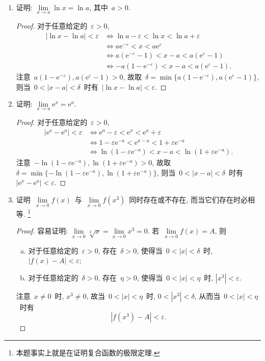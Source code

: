 \documentclass[UTF8,a4paper,11pt,twoside]{book}
\newcommand{\e}{\mathrm e}
\begin{document}
\begin{enumerate}
	\item 证明: $\lim\limits_{x\to a} \ln{x}=\ln{a}$, 其中~$a>0$.
	      \begin{proof}
		      对于任意给定的~$\varepsilon>0$,
		      \[
			      \begin{split}
				      |\ln{x}-\ln{a}|<\varepsilon &\Leftrightarrow  \ln{a}-\varepsilon<\ln{x}<\ln{a}+\varepsilon \\
				      &\Leftrightarrow  a\e^{-\varepsilon}<x<a\e^{\varepsilon}\\
				      &\Leftrightarrow  a(\e^{-\varepsilon}-1)<x-a<a(\e^{\varepsilon}-1)\\
				      &\Leftrightarrow -a(1-\e^{-\varepsilon})<x-a<a(\e^{\varepsilon}-1).
			      \end{split}
		      \]
		      注意~$a(1-\e^{-\varepsilon}), a(\e^{\varepsilon}-1)>0$, 故取~$\delta=\min\{a(1-\e^{-\varepsilon}), a(\e^{\varepsilon}-1)\}$, 则当~$0<|x-a|<\delta$~时有~$|\ln{x}-\ln{a}|<\varepsilon$. \qedhere
	      \end{proof}

	\item 证明: $\lim\limits_{x\to a} \e^{x}=\e^{a}$.
	      \begin{proof}
		      对于任意给定的~$\varepsilon>0$,
		      \[
			      \begin{split}
				      |\e^{x}-\e^{a}|<\varepsilon &\Leftrightarrow \e^{a}-\varepsilon<\e^{x}<\e^{a}+\varepsilon\\
				      &\Leftrightarrow 1-\varepsilon\e^{-a}<\e^{x-a}<1+\varepsilon\e^{-a}\\
				      &\Leftrightarrow \ln(1-\varepsilon\e^{-a})<x-a<\ln(1+\varepsilon\e^{-a}).
			      \end{split}
		      \]
		      注意~$-\ln(1-\varepsilon\e^{-a}),\ln(1+\varepsilon\e^{-a})>0$, 故取~$\delta=\min\{-\ln(1-\varepsilon\e^{-a}),\ln(1+\varepsilon\e^{-a})\}$, 则当~$0<|x-a|<\delta$~时有~$|\e^{x}-\e^{a}|<\varepsilon$. \qedhere
	      \end{proof}

	\item 证明~$\lim\limits_{x\to 0} f(x)$~与~$\lim\limits_{x\to 0} f(x^3)$~同时存在或不存在, 而当它们存在时必相等. \footnote{本题事实上就是在证明复合函数的极限定理.}
	      \begin{proof}
		      容易证明: $\lim\limits_{x\to 0} \sqrt[3]{x}=\lim\limits_{x\to 0} x^3=0$.
		      若~$\lim\limits_{x\to 0} f(x)=A$, 则
		      \begin{enumerate}[(a)]
			      \item 对于任意给定的~$\varepsilon>0$, 存在~$\delta>0$, 使得当~$0<|x|<\delta$~时, $|f(x)-A|<\varepsilon$;
			      \item 对于任意给定的~$\delta>0$, 存在~$\eta>0$, 使得当~$0<|x|<\eta$~时, $|x^3|<\varepsilon$.
		      \end{enumerate}
		      注意~$x\neq 0$~时, $x^3\neq 0$, 故当~$0<|x|<\eta$~时, $0<|x^3|<\delta$, 从而当~$0<|x|<\eta$~时有
		      \[
			      |f(x^3)-A|<\varepsilon.
		      \]


\end{proof}
\end{enumerate}
\end{document}
